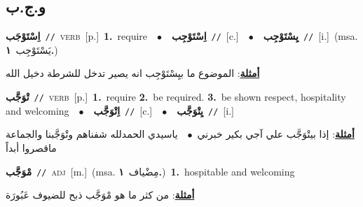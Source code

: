 \documentclass[10pt,a4paper,twoside]{article} %
\begin{document}
\begin{multicols}{2}
\vspace{-3mm}
\subsection*{\color{blue}\foreignlanguage{arabic}{و.ج.ب}\color{blue}{}} 

{\setlength\topsep{0pt}\textbf{\foreignlanguage{arabic}{اِسْتَوْجَب}}\ {\color{gray}\texttt{//}\color{black}}\ \textsc{verb}\ [p.]\ \textbf{1.}~require\ \ $\bullet$\ \ \setlength\topsep{0pt}\textbf{\foreignlanguage{arabic}{اِسْتَوْجِب}}\ {\color{gray}\texttt{//}\color{black}}\ [c.]\ \ $\bullet$\ \ \setlength\topsep{0pt}\textbf{\foreignlanguage{arabic}{يِسْتَوْجِب}}\ {\color{gray}\texttt{//}\color{black}}\ [i.]\ \color{gray}(msa. \foreignlanguage{arabic}{يَسْتَوْجِب}~\foreignlanguage{arabic}{\textbf{١.}})\color{black}\  \begin{flushright}\color{gray}\foreignlanguage{arabic}{\textbf{\underline{\foreignlanguage{arabic}{أمثلة}}}: الموضوع ما بيِسْتَوْجِب انه يصير تدخل للشرطة دخيل الله}\end{flushright}\color{black}} \vspace{2mm}

{\setlength\topsep{0pt}\textbf{\foreignlanguage{arabic}{تْوَجَّب}}\ {\color{gray}\texttt{//}\color{black}}\ \textsc{verb}\ [p.]\ \textbf{1.}~require  \textbf{2.}~be required.  \textbf{3.}~be shown respect, hospitality and welcoming\ \ $\bullet$\ \ \setlength\topsep{0pt}\textbf{\foreignlanguage{arabic}{اِتْوَجَّب}}\ {\color{gray}\texttt{//}\color{black}}\ [c.]\ \ $\bullet$\ \ \setlength\topsep{0pt}\textbf{\foreignlanguage{arabic}{يِتْوَجَّب}}\ {\color{gray}\texttt{//}\color{black}}\ [i.]\  \begin{flushright}\color{gray}\foreignlanguage{arabic}{\textbf{\underline{\foreignlanguage{arabic}{أمثلة}}}: إذا بيتْوَجَّب علي آجي بكير خبرني\ $\bullet$\ \  ياسيدي الحمدلله شفناهم وتْوَجَّبنا والجماعة ماقصروا أبداً}\end{flushright}\color{black}} \vspace{2mm}

{\setlength\topsep{0pt}\textbf{\foreignlanguage{arabic}{مْوَجَّب}}\ {\color{gray}\texttt{//}\color{black}}\ \textsc{adj}\ [m.]\ \color{gray}(msa. \foreignlanguage{arabic}{مِضْياف}~\foreignlanguage{arabic}{\textbf{١.}})\color{black}\ \textbf{1.}~hospitable and welcoming\  \begin{flushright}\color{gray}\foreignlanguage{arabic}{\textbf{\underline{\foreignlanguage{arabic}{أمثلة}}}: من كثر ما هو مْوَجَّب ذبح للضيوف عَبُورَة}\end{flushright}\color{black}} \vspace{2mm}


\end{multicols}
\end{document}
